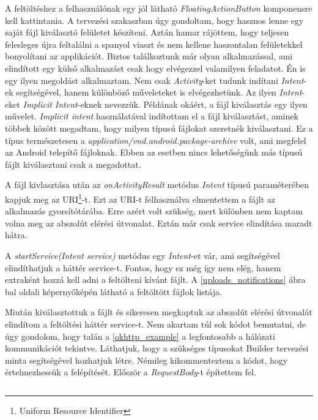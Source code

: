 \documentclass{thesis-ekf}
\theoremstyle{definition}
\theoremstyle{remark}
\begin{document}
A feltöltéshez a felhasználónak egy jól látható \emph{FloatingActionButton} komponensre kell kattintania.
A tervezési szakaszban úgy gondoltam, hogy hasznos lenne egy saját fájl kiválasztó felületet készíteni.
Aztán hamar rájöttem, hogy teljesen felesleges újra feltalálni a spanyol viaszt és nem kellene haszontalan felületekkel bonyolítani az applikációt.
Biztos találkoztunk már olyan alkalmazással, ami elindított egy külső alkalmazást csak hogy elvégezzel valamilyen feladatot.
Én is egy ilyen megoldást alkalmaztam.
Nem csak \emph{Activity}-ket tudunk indítani \emph{Intent}-ek segítségével, hanem különböző műveleteket is elvégezhetünk.
Az ilyen \emph{Intent}-eket \emph{Implicit Intent}-eknek nevezzük.
Példának okáért, a fájl kiválasztás egy ilyen művelet.
\emph{Implicit intent} használatával indítottam el a fájl kiválasztást, aminek többek között megadtam, hogy milyen típusú fájlokat szeretnék kiválasztani.
Ez a típus természetesen a \emph{application/vnd.android.package-archive} volt, ami megfelel az Android telepítő fájloknak.
Ebben az esetben nincs lehetőségünk más típusú fájlt kiválasztani csak a megadottat.

A fájl kivlasztása után az \emph{onActivityResult} metódus \emph{Intent} típusú paraméterében kapjuk meg az URI\footnote{Uniform Resource Identifier}-t.
Ezt az URI-t felhasználva elmentettem a fájlt az alkalmazás gyorsítótárába.
Erre azért volt szükség, mert különben nem kaptam volna meg az abszolút elérési útvonalat.
Eztán már csak service elindítása maradt hátra. 

A \emph{startService(Intent service)} metódus egy \emph{Intent}-et vár, ami segítségével elindíthatjuk a háttér service-t.
Fontos, hogy ez még így nem elég, hanem extraként hozzá kell adni a feltölteni kívánt fájlt.
A \ref{uploads_notifications} ábra bal oldali képernyőképén látható a feltöltött fájlok listája.

Miután kiválasztottuk a fájlt és sikeresen megkaptuk az abszolút elérési útvonalát elindítom a feltöltési háttér service-t.
Nem akartam túl sok kódot bemutatni, de úgy gondolom, hogy talán a \ref{okhttp_example} a legfontosabb a hálózati kommunikációt tekintve.
Láthatjuk, hogy a szükséges típusokat Builder tervezési minta segítségével hozhatjuk létre.
Némileg kikommenteztem a kódot, hogy értelmezhessük a felépítését.
Először a \emph{RequestBody}-t építettem fel.


\inputminted[linenos=true, breaklines]{java}{./codes/okhttp.java}
\end{document}
